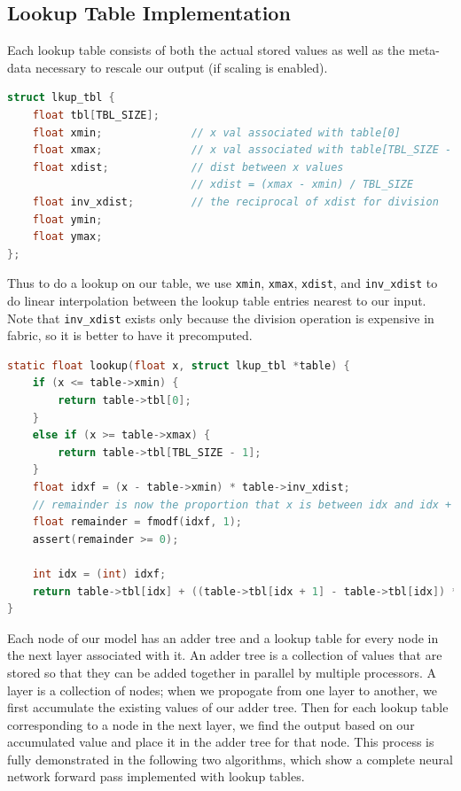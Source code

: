 \documentclass[psamsfonts]{amsart}
\theoremstyle{definition}
\theoremstyle{remark}
\numberwithin{equation}{section}
\begin{document}
\subsection{Lookup Table Implementation}
Each lookup table consists of both the actual stored values as well as the meta-data necessary to rescale our output (if scaling is enabled).

\begin{lstlisting}[language=C]
struct lkup_tbl {
    float tbl[TBL_SIZE];
    float xmin;              // x val associated with table[0]
    float xmax;              // x val associated with table[TBL_SIZE - 1]
    float xdist;             // dist between x values 
                             // xdist = (xmax - xmin) / TBL_SIZE
    float inv_xdist;         // the reciprocal of xdist for division
    float ymin;
    float ymax;
};
\end{lstlisting}

Thus to do a lookup on our table, we use \texttt{xmin}, \texttt{xmax}, \texttt{xdist}, and \texttt{inv\_xdist} to do linear interpolation between the lookup table entries nearest to our input. Note that \texttt{inv\_xdist} exists only because the division operation is expensive in fabric, so it is better to have it precomputed.

\begin{lstlisting}[language=C]
static float lookup(float x, struct lkup_tbl *table) {
    if (x <= table->xmin) {
        return table->tbl[0];
    }
    else if (x >= table->xmax) {
        return table->tbl[TBL_SIZE - 1];
    }
    float idxf = (x - table->xmin) * table->inv_xdist;
    // remainder is now the proportion that x is between idx and idx + 1
    float remainder = fmodf(idxf, 1);
    assert(remainder >= 0);

    int idx = (int) idxf;
    return table->tbl[idx] + ((table->tbl[idx + 1] - table->tbl[idx]) * remainder);
}
\end{lstlisting}

Each node of our model has an adder tree and a lookup table for every node in the next layer associated with it. An adder tree is a collection of values that are stored so that they can be added together in parallel by multiple processors. A layer is a collection of nodes; when we propogate from one layer to another, we first accumulate the existing values of our adder tree. Then for each lookup table corresponding to a node in the next layer, we find the output based on our accumulated value and place it in the adder tree for that node. This process is fully demonstrated in the following two algorithms, which show a complete neural network forward pass implemented with lookup tables.
\end{document}
